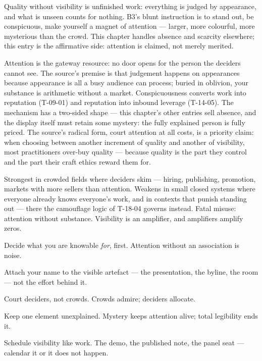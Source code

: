 \begin{core}
Quality without visibility is unfinished work: everything is judged by appearance, and what is unseen counts for nothing. B3's blunt instruction is to stand out, be conspicuous, make yourself a magnet of attention --- larger, more colourful, more mysterious than the crowd. This chapter handles absence and scarcity elsewhere; this entry is the affirmative side: attention is claimed, not merely merited.
\end{core}
\begin{mechanism}
Attention is the gateway resource: no door opens for the person the deciders cannot see. The source's premise is that judgement happens on appearances because appearance is all a busy audience can process; buried in oblivion, your substance is arithmetic without a market. Conspicuousness converts work into reputation (T-09-01) and reputation into inbound leverage (T-14-05). The mechanism has a two-sided shape --- this chapter's other entries sell absence, and the display itself must retain some mystery: the fully explained person is fully priced. The source's radical form, court attention at all costs, is a priority claim: when choosing between another increment of quality and another of visibility, most practitioners over-buy quality --- because quality is the part they control and the part their craft ethics reward them for.
\end{mechanism}
\begin{conditions}
Strongest in crowded fields where deciders skim --- hiring, publishing, promotion, markets with more sellers than attention. Weakens in small closed systems where everyone already knows everyone's work, and in contexts that punish standing out --- there the camouflage logic of T-18-04 governs instead. Fatal misuse: attention without substance. Visibility is an amplifier, and amplifiers amplify zeros.
\end{conditions}
\begin{application}
  \item Decide what you are knowable \emph{for}, first. Attention without an association is noise.
  \item Attach your name to the visible artefact --- the presentation, the byline, the room --- not the effort behind it.
  \item Court deciders, not crowds. Crowds admire; deciders allocate.
  \item Keep one element unexplained. Mystery keeps attention alive; total legibility ends it.
  \item Schedule visibility like work. The demo, the published note, the panel seat --- calendar it or it does not happen.
\end{application}
